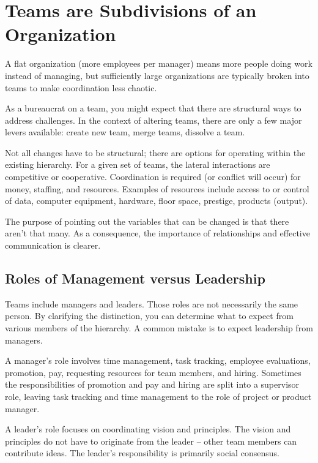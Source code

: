 

\section{Teams are Subdivisions of an Organization}

A flat organization (more employees per manager) means more people doing work instead of managing, but sufficiently large organizations are typically broken into teams to make coordination less chaotic. 


As a bureaucrat on a team, you might expect that there are structural ways to address challenges. 
In the context of altering teams, there are only a few major levers available: create new team, merge teams, dissolve a team. 

Not all changes have to be structural; there are options for operating within the existing hierarchy.
For a given set of teams, the lateral interactions are competitive or cooperative. Coordination is required (or conflict will occur) for money, staffing, and resources. Examples of resources include access to or control of data, computer equipment, hardware, floor space, prestige, products (output).

The purpose of pointing out the variables that can be changed is that there aren't that many. As a consequence, the importance of  relationships and effective communication is clearer. 

\subsection*{Roles of Management versus Leadership}

Teams include managers and leaders. Those roles are not necessarily the same person. By clarifying the distinction, you can determine what to expect from various members of the hierarchy. A common mistake is to expect leadership from managers. 

A manager's role involves time management, task tracking, employee evaluations, promotion, pay, requesting resources for team members, and hiring. Sometimes the responsibilities of promotion and pay and hiring are split into a supervisor role, leaving task tracking and time management to the role of project or product manager.

A leader's role focuses on coordinating vision and principles. The vision and principles do not have to originate from the leader -- other team members can contribute ideas. The leader's responsibility is primarily social consensus. 
